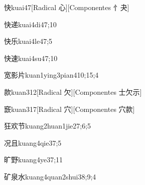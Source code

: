 \begin{verbete}{快}{kuai4}{7}[Radical 心][Componentes 忄夬]
\end{verbete}

\begin{verbete}{快递}{kuai4di4}{7;10}
\end{verbete}

\begin{verbete}{快乐}{kuai4le4}{7;5}
\end{verbete}

\begin{verbete}{快速}{kuai4su4}{7;10}
\end{verbete}

\begin{verbete}{宽影片}{kuan1ying3pian4}{10;15;4}
\end{verbete}

\begin{verbete}{款}{kuan3}{12}[Radical 欠][Componentes 士欠示]
\end{verbete}

\begin{verbete}{窾}{kuan3}{17}[Radical 穴][Componentes 穴款]
\end{verbete}

\begin{verbete}{狂欢节}{kuang2huan1jie2}{7;6;5}
\end{verbete}

\begin{verbete}{况且}{kuang4qie3}{7;5}
\end{verbete}

\begin{verbete}{旷野}{kuang4ye3}{7;11}
\end{verbete}

\begin{verbete}{矿泉水}{kuang4quan2shui3}{8;9;4}
\end{verbete}


